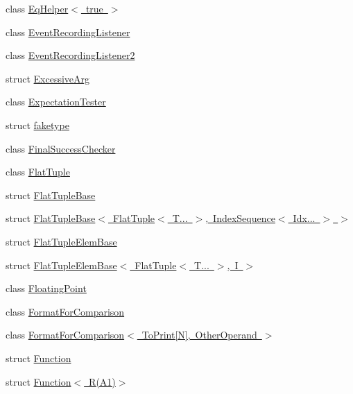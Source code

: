 \begin{DoxyCompactItemize}
class \mbox{\hyperlink{classtesting_1_1internal_1_1_eq_helper_3_01true_01_4}{Eq\+Helper$<$ true $>$}}
\item 
class \mbox{\hyperlink{classtesting_1_1internal_1_1_event_recording_listener}{Event\+Recording\+Listener}}
\item 
class \mbox{\hyperlink{classtesting_1_1internal_1_1_event_recording_listener2}{Event\+Recording\+Listener2}}
\item 
struct \mbox{\hyperlink{structtesting_1_1internal_1_1_excessive_arg}{Excessive\+Arg}}
\item 
class \mbox{\hyperlink{classtesting_1_1internal_1_1_expectation_tester}{Expectation\+Tester}}
\item 
struct \mbox{\hyperlink{structtesting_1_1internal_1_1faketype}{faketype}}
\item 
class \mbox{\hyperlink{classtesting_1_1internal_1_1_final_success_checker}{Final\+Success\+Checker}}
\item 
class \mbox{\hyperlink{classtesting_1_1internal_1_1_flat_tuple}{Flat\+Tuple}}
\item 
struct \mbox{\hyperlink{structtesting_1_1internal_1_1_flat_tuple_base}{Flat\+Tuple\+Base}}
\item 
struct \mbox{\hyperlink{structtesting_1_1internal_1_1_flat_tuple_base_3_01_flat_tuple_3_01_t_8_8_8_01_4_00_01_index_sequence_3_01_idx_8_8_8_01_4_01_4}{Flat\+Tuple\+Base$<$ Flat\+Tuple$<$ T... $>$, Index\+Sequence$<$ Idx... $>$ $>$}}
\item 
struct \mbox{\hyperlink{structtesting_1_1internal_1_1_flat_tuple_elem_base}{Flat\+Tuple\+Elem\+Base}}
\item 
struct \mbox{\hyperlink{structtesting_1_1internal_1_1_flat_tuple_elem_base_3_01_flat_tuple_3_01_t_8_8_8_01_4_00_01_i_01_4}{Flat\+Tuple\+Elem\+Base$<$ Flat\+Tuple$<$ T... $>$, I $>$}}
\item 
class \mbox{\hyperlink{classtesting_1_1internal_1_1_floating_point}{Floating\+Point}}
\item 
class \mbox{\hyperlink{classtesting_1_1internal_1_1_format_for_comparison}{Format\+For\+Comparison}}
\item 
class \mbox{\hyperlink{classtesting_1_1internal_1_1_format_for_comparison_3_01_to_print[_n]_00_01_other_operand_01_4}{Format\+For\+Comparison$<$ To\+Print\mbox{[}\+N\mbox{]}, Other\+Operand $>$}}
\item 
struct \mbox{\hyperlink{structtesting_1_1internal_1_1_function}{Function}}
\item 
struct \mbox{\hyperlink{structtesting_1_1internal_1_1_function_3_01_r_07_a1_08_4}{Function$<$ R(\+A1)$>$}}

\end{DoxyCompactItemize}
